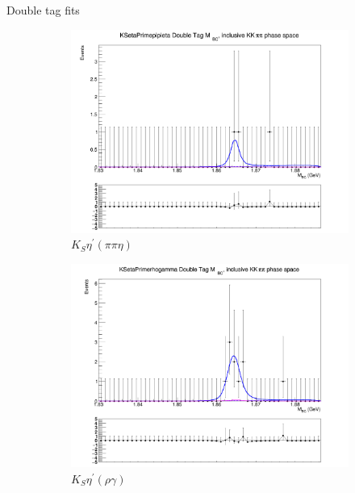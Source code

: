 \documentclass{beamer}
\begin{document}
\begin{frame}{Double tag fits}
\begin{figure}
\begin{subfigure}{0.33\textwidth}
      \centering
      \includegraphics[width=1.0\textwidth]{Plots/DoubleTagYield_DoubleTag_CP_KKpipi_vs_KSetaPrimepipieta_SignalBin0.png}
      \caption{$K_S\eta^\prime(\pi\pi\eta)$}
    \end{subfigure}%
    \begin{subfigure}{0.33\textwidth}
      \centering
      \includegraphics[width=1.0\textwidth]{Plots/DoubleTagYield_DoubleTag_CP_KKpipi_vs_KSetaPrimerhogamma_SignalBin0.png}
      \caption{$K_S\eta^\prime(\rho\gamma)$}
    \end{subfigure}%
    \begin{subfigure}{0.33\textwidth}
      \centering

\end{subfigure}
\end{figure}
\end{frame}
\end{document}
